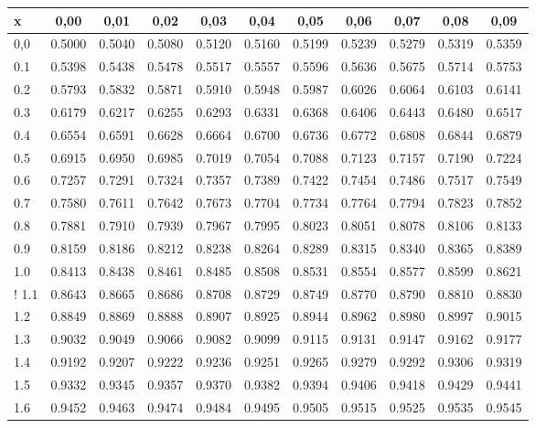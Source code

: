 \documentclass[12pt]{report}
\begin{document}
\begin{tabular}{|l|c|c|c|c|c|c|c|c|c|c|}
    \hline
    x & 0,00 & 0,01 & 0,02 & 0,03 & 0,04 & 0,05 & 0,06 & 0,07 & 0,08 & 0,09\\ 
    \hline 
0,0 & 0.5000 & 0.5040 & 0.5080 & 0.5120 & 0.5160 & 0.5199 & 0.5239& 0.5279& 0.5319& 0.5359\\
\hline
0.1 & 0.5398 & 0.5438 & 0.5478 & 0.5517 & 0.5557 & 0.5596 & 0.5636& 0.5675& 0.5714& 0.5753\\
\hline
0.2 & 0.5793 & 0.5832 & 0.5871 & 0.5910 & 0.5948 & 0.5987 & 0.6026& 0.6064& 0.6103& 0.6141\\
\hline
0.3 & 0.6179 & 0.6217 & 0.6255 & 0.6293 & 0.6331 & 0.6368 & 0.6406& 0.6443& 0.6480& 0.6517\\
\hline
0.4 & 0.6554 & 0.6591 & 0.6628 & 0.6664 & 0.6700 & 0.6736 & 0.6772& 0.6808& 0.6844& 0.6879\\
\hline
0.5 & 0.6915 & 0.6950 & 0.6985 & 0.7019 & 0.7054 & 0.7088 & 0.7123& 0.7157& 0.7190& 0.7224\\
\hline
0.6 & 0.7257 & 0.7291 & 0.7324 & 0.7357 & 0.7389 & 0.7422 & 0.7454& 0.7486& 0.7517& 0.7549\\
\hline
0.7 & 0.7580 & 0.7611 & 0.7642 & 0.7673 & 0.7704 & 0.7734 & 0.7764& 0.7794& 0.7823& 0.7852\\
\hline
0.8 & 0.7881 & 0.7910 & 0.7939 & 0.7967 & 0.7995 & 0.8023 & 0.8051& 0.8078& 0.8106& 0.8133\\
\hline
0.9 & 0.8159 & 0.8186 & 0.8212 & 0.8238 & 0.8264 & 0.8289 & 0.8315& 0.8340& 0.8365& 0.8389\\
\hline
1.0 & 0.8413 & 0.8438 & 0.8461 & 0.8485 & 0.8508 & 0.8531 & 0.8554& 0.8577& 0.8599& 0.8621\\
\hline!
1.1 & 0.8643 & 0.8665 & 0.8686 & 0.8708 & 0.8729 & 0.8749 & 0.8770& 0.8790& 0.8810& 0.8830\\
\hline
1.2 & 0.8849 & 0.8869 & 0.8888 & 0.8907 & 0.8925 & 0.8944 & 0.8962& 0.8980& 0.8997& 0.9015\\
\hline
1.3 & 0.9032 & 0.9049 & 0.9066 & 0.9082 & 0.9099 & 0.9115 & 0.9131& 0.9147& 0.9162& 0.9177\\
\hline
1.4 & 0.9192 & 0.9207 & 0.9222 & 0.9236 & 0.9251 & 0.9265 & 0.9279& 0.9292& 0.9306& 0.9319\\
\hline
1.5 & 0.9332 & 0.9345 & 0.9357 & 0.9370 & 0.9382 & 0.9394 & 0.9406& 0.9418& 0.9429& 0.9441\\
\hline
1.6 & 0.9452 & 0.9463 & 0.9474 & 0.9484 & 0.9495 & 0.9505 & 0.9515& 0.9525& 0.9535& 0.9545\\
\hline

\end{tabular}
\end{document}
